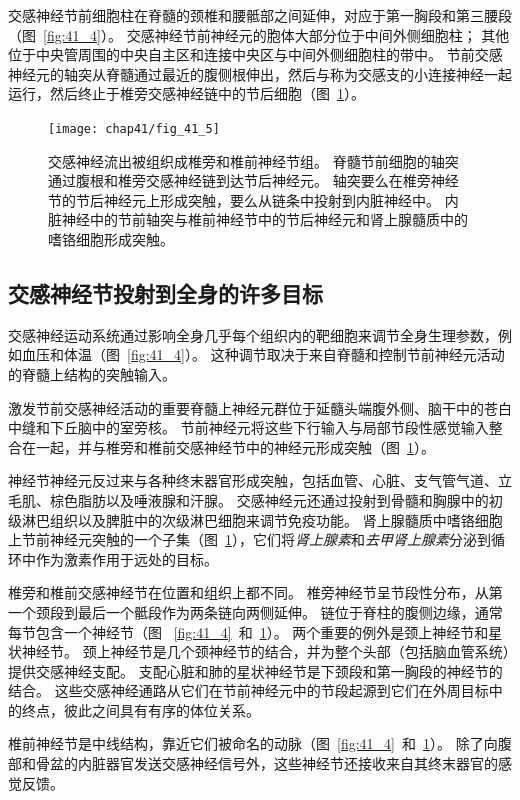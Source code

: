 交感神经节前细胞柱在脊髓的颈椎和腰骶部之间延伸，对应于第一胸段和第三腰段（图~\ref{fig:41_4}）。
交感神经节前神经元的胞体大部分位于中间外侧细胞柱；
其他位于中央管周围的中央自主区和连接中央区与中间外侧细胞柱的带中。
节前交感神经元的轴突从脊髓通过最近的腹侧根伸出，然后与称为交感支的小连接神经一起运行，然后终止于椎旁交感神经链中的节后细胞（图~\ref{fig:41_5}）。


\begin{figure}[htbp]
	\centering
	\texttt{[image: chap41/fig\_41\_5]}
	\caption{交感神经流出被组织成椎旁和椎前神经节组。
		脊髓节前细胞的轴突通过腹根和椎旁交感神经链到达节后神经元。
		轴突要么在椎旁神经节的节后神经元上形成突触，要么从链条中投射到内脏神经中。
		内脏神经中的节前轴突与椎前神经节中的节后神经元和肾上腺髓质中的嗜铬细胞形成突触。}
	\label{fig:41_5}
\end{figure}


\subsection{交感神经节投射到全身的许多目标}

交感神经运动系统通过影响全身几乎每个组织内的靶细胞来调节全身生理参数，例如血压和体温（图~\ref{fig:41_4}）。
这种调节取决于来自脊髓和控制节前神经元活动的脊髓上结构的突触输入。


激发节前交感神经活动的重要脊髓上神经元群位于延髓头端腹外侧、脑干中的苍白中缝和下丘脑中的室旁核。
节前神经元将这些下行输入与局部节段性感觉输入整合在一起，并与椎旁和椎前交感神经节中的神经元形成突触（图~\ref{fig:41_5}）。


神经节神经元反过来与各种终末器官形成突触，包括血管、心脏、支气管气道、立毛肌、棕色脂肪以及唾液腺和汗腺。
交感神经元还通过投射到骨髓和胸腺中的初级淋巴组织以及脾脏中的次级淋巴细胞来调节免疫功能。
肾上腺髓质中嗜铬细胞上节前神经元突触的一个子集（图~\ref{fig:41_5}），它们将\textit{肾上腺素}和\textit{去甲肾上腺素}分泌到循环中作为激素作用于远处的目标。


椎旁和椎前交感神经节在位置和组织上都不同。
椎旁神经节呈节段性分布，从第一个颈段到最后一个骶段作为两条链向两侧延伸。
链位于脊柱的腹侧边缘，通常每节包含一个神经节（图 ~\ref{fig:41_4}~和~\ref{fig:41_5}）。
两个重要的例外是颈上神经节和星状神经节。
颈上神经节是几个颈神经节的结合，并为整个头部（包括脑血管系统）提供交感神经支配。
支配心脏和肺的星状神经节是下颈段和第一胸段的神经节的结合。
这些交感神经通路从它们在节前神经元中的节段起源到它们在外周目标中的终点，彼此之间具有有序的体位关系。


椎前神经节是中线结构，靠近它们被命名的动脉（图~\ref{fig:41_4}~和~\ref{fig:41_5}）。
除了向腹部和骨盆的内脏器官发送交感神经信号外，这些神经节还接收来自其终末器官的感觉反馈。



